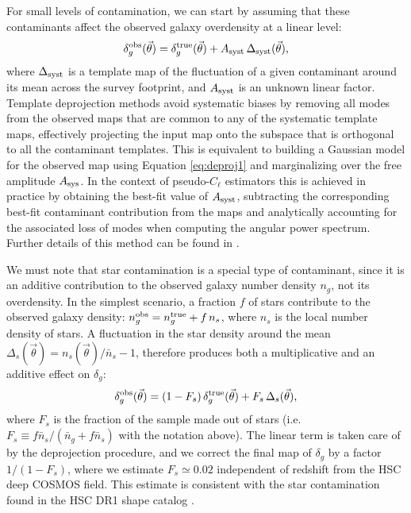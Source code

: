 \documentclass[a4paper,11pt]{article}
\newcommand{\nv}{\vec{\theta}}
\begin{document}
    For small levels of contamination, we can start by assuming that these contaminants affect the observed galaxy overdensity at a linear level:
    \begin{equation}\label{eq:deproj1}
      \delta_g^{\rm obs}(\nv) = \delta_g^{\rm true}(\nv) + A_{\rm syst}\,\Delta_{\rm syst}(\nv),
    \end{equation}
    where $\Delta_{\rm syst}$ is a template map of the fluctuation of a given contaminant around its mean across the survey footprint, and $A_{\rm syst}$ is an unknown linear factor. Template deprojection methods avoid systematic biases by removing all modes from the observed maps that are common to any of the systematic template maps, effectively projecting the input map onto the subspace that is orthogonal to all the contaminant templates. This is equivalent to building a Gaussian model for the observed map using Equation \ref{eq:deproj1} and marginalizing over the free amplitude $A_{\rm sys}$. In the context of pseudo-$C_\ell$ estimators this is achieved in practice by obtaining the best-fit value of $A_{\rm syst}$, subtracting the corresponding best-fit contaminant contribution from the maps and analytically accounting for the associated loss of modes when computing the angular power spectrum. Further details of this method can be found in \cite{2017MNRAS.465.1847E,2019MNRAS.484.4127A}.
    
    We must note that star contamination is a special type of contaminant, since it is an additive contribution to the observed galaxy number density $n_g$, not its overdensity. In the simplest scenario, a fraction $f$ of stars contribute to the observed galaxy density: $n_g^{\rm obs}=n^{\rm true}_g+f\,n_s$, where $n_s$ is the local number density of stars. A fluctuation in the star density around the mean $\Delta_s(\nv)=n_s(\nv)/\bar{n}_s-1$, therefore produces both a multiplicative and an additive effect on $\delta_g$:
    \begin{equation}
      \delta_g^{\rm obs}(\nv) = (1-F_s)\,\delta_g^{\rm true}(\nv)+F_s\,\Delta_s(\nv),
    \end{equation}
    where $F_s$ is the fraction of the sample made out of stars (i.e. $F_s\equiv f\bar{n}_s/(\bar{n}_g+f\bar{n}_s)$ with the notation above). The linear term is taken care of by the deprojection procedure, and we correct the final map of $\delta_g$ by a factor $1/(1-F_s)$, where we estimate $F_s\simeq0.02$ independent of redshift from the HSC deep COSMOS field. This estimate is consistent with the star contamination found in the HSC DR1 shape catalog \citep{2018PASJ...70S..25M}.
\end{document}
